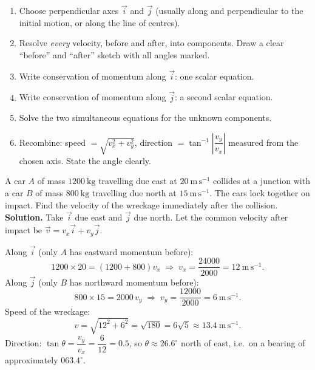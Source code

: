 \documentclass[11pt]{article}
\begin{document}
\begin{methode}
\begin{enumerate}
\item Choose perpendicular axes $\vec{i}$ and $\vec{j}$ (usually along and perpendicular to the initial motion, or along the line of centres).
\item Resolve \emph{every} velocity, before and after, into components. Draw a clear ``before'' and ``after'' sketch with all angles marked.
\item Write conservation of momentum along $\vec{i}$: one scalar equation.
\item Write conservation of momentum along $\vec{j}$: a second scalar equation.
\item Solve the two simultaneous equations for the unknown components.
\item Recombine: speed $=\sqrt{v_x^2+v_y^2}$, direction $=\tan^{-1}\!\left|\dfrac{v_y}{v_x}\right|$ measured from the chosen axis. State the angle clearly.
\end{enumerate}
\end{methode}

\begin{exoresolu}
A car $A$ of mass $1200\ \mathrm{kg}$ travelling due east at $20\ \mathrm{m\,s^{-1}}$ collides at a junction with a car $B$ of mass $800\ \mathrm{kg}$ travelling due north at $15\ \mathrm{m\,s^{-1}}$. The cars lock together on impact. Find the velocity of the wreckage immediately after the collision.
\tcblower
\textbf{Solution.} Take $\vec{i}$ due east and $\vec{j}$ due north. Let the common velocity after impact be $\vec{v}=v_x\vec{i}+v_y\vec{j}$.

Along $\vec{i}$ (only $A$ has eastward momentum before):
\[
1200\times 20=(1200+800)v_x \;\Longrightarrow\; v_x=\frac{24000}{2000}=12\ \mathrm{m\,s^{-1}}.
\]
Along $\vec{j}$ (only $B$ has northward momentum before):
\[
800\times 15=2000\,v_y \;\Longrightarrow\; v_y=\frac{12000}{2000}=6\ \mathrm{m\,s^{-1}}.
\]
Speed of the wreckage:
\[
v=\sqrt{12^2+6^2}=\sqrt{180}=6\sqrt{5}\approx 13.4\ \mathrm{m\,s^{-1}}.
\]
Direction: $\tan\theta=\dfrac{v_y}{v_x}=\dfrac{6}{12}=0.5$, so $\theta\approx 26.6^{\circ}$ north of east, i.e.\ on a bearing of approximately $063.4^{\circ}$.
\end{exoresolu}
\end{document}
